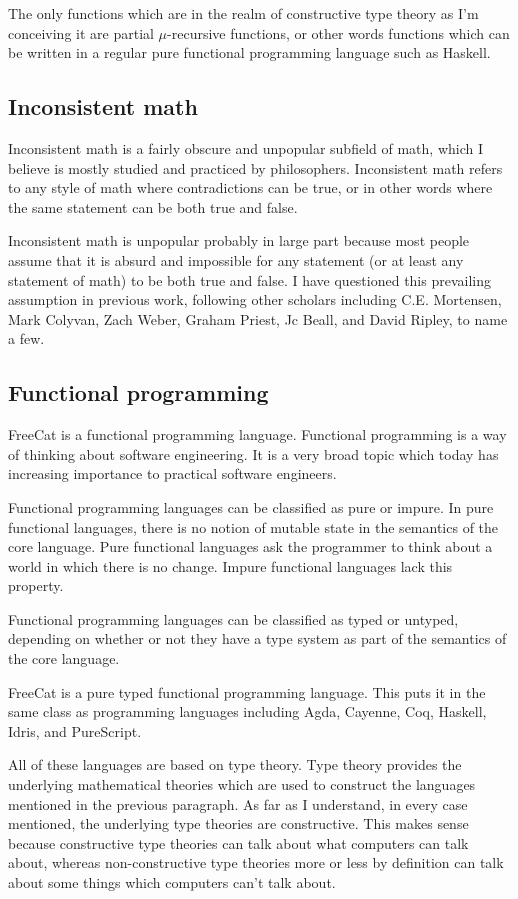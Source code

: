 \documentclass{article}
\begin{document}
The only functions which are in the realm of constructive type theory as I'm conceiving it are partial $\mu$-recursive functions, or other words functions which can be written in a regular pure functional programming language such as Haskell.

\subsection{Inconsistent math}

Inconsistent math is a fairly obscure and unpopular subfield of math, which I believe is mostly studied and practiced by philosophers. Inconsistent math refers to any style of math where contradictions can be true, or in other words where the same statement can be both true and false.

Inconsistent math is unpopular probably in large part because most people assume that it is absurd and impossible for any statement (or at least any statement of math) to be both true and false. I have questioned this prevailing assumption in previous work, following other scholars including C.E. Mortensen, Mark Colyvan, Zach Weber, Graham Priest, Jc Beall, and David Ripley, to name a few.

\subsection{Functional programming}

FreeCat is a functional programming language. Functional programming is a way of thinking about software engineering. It is a very broad topic which today has increasing importance to practical software engineers.

Functional programming languages can be classified as pure or impure. In pure functional languages, there is no notion of mutable state in the semantics of the core language. Pure functional languages ask the programmer to think about a world in which there is no change. Impure functional languages lack this property.

Functional programming languages can be classified as typed or untyped, depending on whether or not they have a type system as part of the semantics of the core language.

FreeCat is a pure typed functional programming language. This puts it in the same class as programming languages including Agda, Cayenne, Coq, Haskell, Idris, and PureScript.

All of these languages are based on type theory. Type theory provides the underlying mathematical theories which are used to construct the languages mentioned in the previous paragraph. As far as I understand, in every case mentioned, the underlying type theories are constructive. This makes sense because constructive type theories can talk about what computers can talk about, whereas non-constructive type theories more or less by definition can talk about some things which computers can't talk about.
\end{document}
